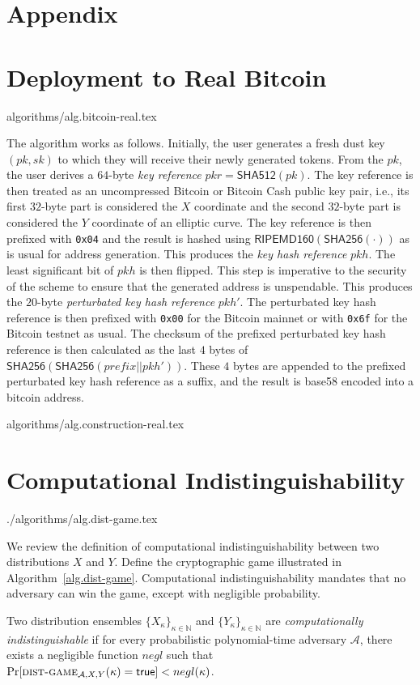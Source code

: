 \section*{Appendix}
\section{Deployment to Real Bitcoin}
{algorithms/alg.bitcoin-real.tex}

The algorithm works as follows. Initially, the user generates a fresh dust key
$(pk, sk)$ to which they will receive their newly generated tokens.  From the $pk$, the user derives a $64$-byte
\emph{key reference} $pkr = \textsf{SHA512}(pk)$. The key reference is then
treated as an uncompressed Bitcoin or Bitcoin Cash public key pair, i.e., its
first $32$-byte part is considered the $X$ coordinate and the second $32$-byte
part is considered the $Y$ coordinate of an elliptic curve. The key reference is
then prefixed with \texttt{0x04} and the result is hashed using
$\textsf{RIPEMD160}(\textsf{SHA256}(\cdot))$ as is usual for address generation.
This produces the \emph{key hash reference} $pkh$. The least significant bit of
$pkh$ is then flipped. This step is imperative to the security of the scheme to
ensure that the generated address is unspendable. This produces the $20$-byte
\emph{perturbated key hash reference} $pkh'$. The perturbated key hash reference
is then prefixed with \texttt{0x00} for the Bitcoin mainnet or with
\texttt{0x6f} for the Bitcoin testnet as usual. The checksum of the prefixed
perturbated key hash reference is then calculated as the last $4$ bytes of
$\textsf{SHA256}(\textsf{SHA256}(prefix || pkh'))$. These $4$ bytes are appended
to the prefixed perturbated key hash reference as a suffix, and the result is
\textsf{base58} encoded into a bitcoin address.

{algorithms/alg.construction-real.tex}

\section{Computational Indistinguishability}

{./algorithms/alg.dist-game.tex}

We review the definition of computational indistinguishability between two
distributions $X$ and $Y$. Define the cryptographic game illustrated in
Algorithm~\ref{alg.dist-game}.
Computational indistinguishability mandates that no adversary can win the game,
except with negligible probability.

\begin{definition}
  Two distribution ensembles $\{X_\kappa\}_{\kappa\in\mathbb{N}}$ and $\{Y_\kappa\}_{\kappa\in\mathbb{N}}$ are
  \emph{computationally indistinguishable}
  if for every probabilistic polynomial-time adversary $\mathcal{A}$,
  there exists a negligible function $negl$ such that
  $\Pr[\textsc{dist-game}_{\mathcal{A},X,Y}(\kappa) = \mathsf{true}] < negl(\kappa)$.
\end{definition}
